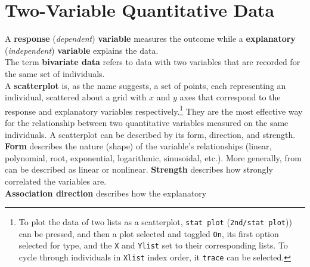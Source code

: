 \documentclass[../AP_Statistics.tex]{subfiles}
\begin{document}
	\chapter{Two-Variable Quantitative Data}
		A \textbf{response} (\emph{dependent}) \textbf{variable} measures the outcome while a \textbf{explanatory} (\emph{independent}) \textbf{variable} explains the data. \\
		The term \textbf{bivariate data} refers to data with two variables that are recorded for the same set of individuals. \\
		A \textbf{scatterplot} is, as the name suggests, a set of points, each representing an individual, scattered about a grid with $x$ and $y$ axes that correspond to the response and explanatory variables respectively.\footnote{To plot the data of two lists as a scatterplot, \texttt{stat plot} (\texttt{2nd/stat plot})) can be pressed, and then a plot selected and toggled \texttt{On}, its first option selected for type, and the \texttt{X} and \texttt{Ylist} set to their corresponding lists. To cycle through individuals in \texttt{Xlist} index order, it \texttt{trace} can be selected.} They are the most effective way for the relationship between two quantitative variables measured on the same individuals.
		A scatterplot can be described by its form, direction, and strength. \\
		\textbf{Form} describes the nature (shape) of the variable's relationships (linear, polynomial, root, exponential, logarithmic, sinusoidal, etc.). More generally, from can be described as linear or nonlinear.
		\textbf{Strength} describes how strongly correlated the variables are. \\
		\textbf{Association direction} describes how the explanatory
\end{document}
